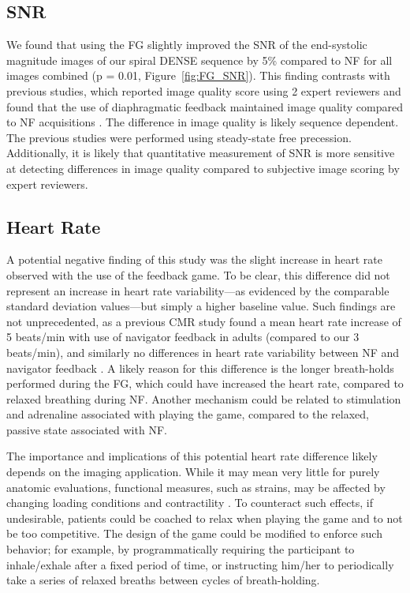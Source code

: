 	\subsection{SNR}
		We found that using the FG slightly improved the SNR of the end-systolic magnitude images of our spiral DENSE sequence by 5\% compared to NF for all images combined (p = 0.01, Figure~\ref{fig:FG_SNR}). This finding contrasts with previous studies, which reported image quality score using 2 expert reviewers and found that the use of diaphragmatic feedback maintained image quality compared to NF acquisitions \cite{Feuerlein2009,Jhooti2011}. The difference in image quality is likely sequence dependent. The previous studies were performed using steady-state free precession. Additionally, it is likely that quantitative measurement of SNR is more sensitive at detecting differences in image quality compared to subjective image scoring by expert reviewers.
	
	\subsection{Heart Rate}
		A potential negative finding of this study was the slight increase in heart rate observed with the use of the feedback game. To be clear, this difference did not represent an increase in heart rate variability—as evidenced by the comparable standard deviation values—but simply a higher baseline value. Such findings are not unprecedented, as a previous CMR study found a mean heart rate increase of 5 beats/min with use of navigator feedback in adults (compared to our 3 beats/min), and similarly no differences in heart rate variability between NF and navigator feedback \cite{Feuerlein2009}. A likely reason for this difference is the longer breath-holds performed during the FG, which could have increased the heart rate, compared to relaxed breathing during NF. Another mechanism could be related to stimulation and adrenaline associated with playing the game, compared to the relaxed, passive state associated with NF.
		
		The importance and implications of this potential heart rate difference likely depends on the imaging application. While it may mean very little for purely anatomic evaluations, functional measures, such as strains, may be affected by changing loading conditions and contractility \cite{Boettler2005}. To counteract such effects, if undesirable, patients could be coached to relax when playing the game and to not be too competitive. The design of the game could be modified to enforce such behavior; for example, by programmatically requiring the participant to inhale/exhale after a fixed period of time, or instructing him/her to periodically take a series of relaxed breaths between cycles of breath-holding.
	
